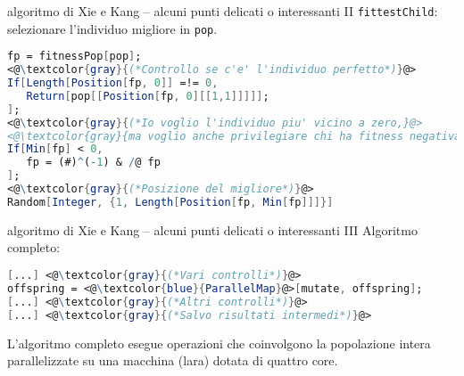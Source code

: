 \documentclass[10pt]{beamer}
\begin{document}
\begin{frame}[fragile]{algoritmo di Xie e Kang -- alcuni punti delicati o interessanti II}
	\texttt{fittestChild}: selezionare l'individuo migliore in \texttt{pop}.

\begin{lstlisting}[language=Mathematica,basicstyle=\ttfamily,keywordstyle=\color{blue}]	
fp = fitnessPop[pop];
<@\textcolor{gray}{(*Controllo se c'e' l'individuo perfetto*)}@>
If[Length[Position[fp, 0]] =!= 0,
   Return[pop[[Position[fp, 0][[1,1]]]]];
];
<@\textcolor{gray}{(*Io voglio l'individuo piu' vicino a zero,}@>
<@\textcolor{gray}{ma voglio anche privilegiare chi ha fitness negativa*)}@>
If[Min[fp] < 0,
   fp = (#)^(-1) & /@ fp
];
<@\textcolor{gray}{(*Posizione del migliore*)}@>
Random[Integer, {1, Length[Position[fp, Min[fp]]]}]
\end{lstlisting}
\end{frame}

\begin{frame}[fragile]{algoritmo di Xie e Kang -- alcuni punti delicati o interessanti III}
Algoritmo completo:
	
\begin{lstlisting}[language=Mathematica,basicstyle=\ttfamily,keywordstyle=\color{blue}]	
[...] <@\textcolor{gray}{(*Vari controlli*)}@>
offspring = <@\textcolor{blue}{ParallelMap}@>[mutate, offspring];
[...] <@\textcolor{gray}{(*Altri controlli*)}@>
[...] <@\textcolor{gray}{(*Salvo risultati intermedi*)}@>
\end{lstlisting}
L'algoritmo completo esegue operazioni che coinvolgono la popolazione intera parallelizzate su una macchina (lara) dotata di quattro core. 

\end{frame}
\end{document}

